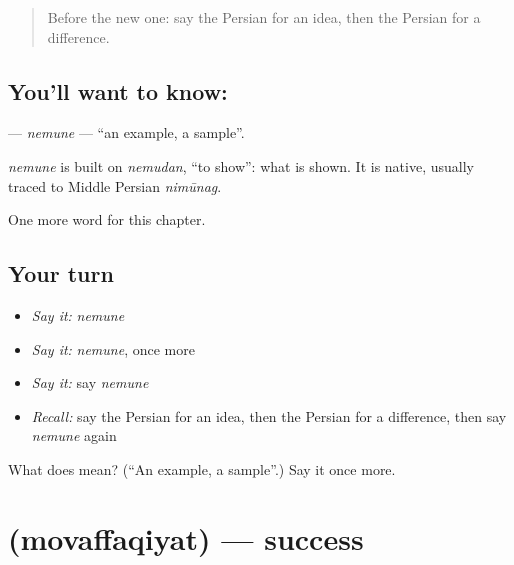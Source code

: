 \label{lesson:FA-C198-nemune}



\begin{quote}
Before the new one: say the Persian for an idea, then the Persian for a difference.
\end{quote}

\subsection*{You'll want to know: }
\textbf{} — \emph{nemune} — \textquotedblleft{}an example, a sample\textquotedblright{}.

\begin{cousinweb}
\emph{nemune} is built on \emph{nemudan}, \textquotedblleft{}to show\textquotedblright{}: what is shown. It is native, usually traced to Middle Persian \emph{nimūnag}.
\end{cousinweb}

\begin{grammarlens}[title={What you've built}]
One more word for this chapter.
\end{grammarlens}

\subsection*{Your turn}
\begin{itemize}
\raggedright
  \item \emph{Say it:} \emph{nemune}
  \item \emph{Say it:} \emph{nemune}, once more
  \item \emph{Say it:} say \emph{nemune}
  \item \emph{Recall:} say the Persian for an idea, then the Persian for a difference, then say \emph{nemune} again
\end{itemize}

\begin{tcolorbox}[breakable,colback=teal!4,colframe=teal!35!black,title={Before you move on}]
What does  mean? (\textquotedblleft{}An example, a sample\textquotedblright{}.) Say it once more.
\end{tcolorbox}
\section[\texorpdfstring{\fa{موفقیت} (movaffaqiyat)}{موفقیت (movaffaqiyat)}]{ (movaffaqiyat) — success}

\label{lesson:FA-C198-movaffaqiyat}



